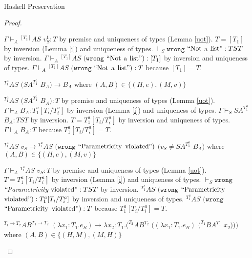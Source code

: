 \begin{theorem}{Haskell Preservation}
\begin{proof}
\begin{case}
$\Gamma\vdash_{A}{^{[T_{1}]}AS}$ $v_{S}^{1}:T$ by premise and uniqueness of types (Lemma \ref{uot}).  $T=[T_{1}]$ by inversion (Lemma \ref{i}) and uniqueness of types.  $\vdash_{S}\mathtt{wrong}$ $\mathrm{``Not}$ $\mathrm{a}$ $\mathrm{list"}:TST$ by inversion.  $\Gamma\vdash_{A}{^{[T_{1}]}A}S$ $(\mathtt{wrong}$ $\mathrm{``Not}$ $\mathrm{a}$ $\mathrm{list"}):[T_{1}]$ by inversion and uniqueness of types.  $\Gamma\vdash_{A}{^{[T_{1}]}A}S$ $(\mathtt{wrong}$ $\mathrm{``Not}$ $\mathrm{a}$ $\mathrm{list"}):T$ because $[T_{1}]=T$.
\end{case}


\begin{case}
$^{T_{1}^{a}}AS$ $(SA^{T_{1}^{a}}$ $B_{A})\rightarrow B_{A}$ where $(A,B)\in\lbrace(H,e),(M,v)\rbrace$

$^{T_{1}^{a}}AS$ $(SA^{T_{1}^{a}}$ $B_{A}):T$ by premise and uniqueness of types (Lemma \ref{uot}).  $\Gamma\vdash_{A}B_{A}:T_{1}^{a}[T_{i}/T_{i}^{a}]$ by inversion (Lemma \ref{i}) and uniqueness of types.  $\Gamma\vdash_{S}SA^{T_{1}^{a}}$ $B_{A}:TST$ by inversion.  $T=T_{1}^{a}[T_{i}/T_{i}^{a}]$ by inversion and uniqueness of types.  $\Gamma\vdash_{A}B_{A}:T$ because $T_{1}^{a}[T_{i}/T_{i}^{a}]=T$.
\end{case}


\begin{case}
$^{T_{1}^{a}}AS$ $v_{S}\rightarrow{^{T_{1}^{a}}A}S$ $(\mathtt{wrong}$ $\mathrm{``Parametricity}$ $\mathrm{violated"})$ $(v_{S}\neq SA^{T_{1}^{a}}$ $B_{A})$ where $(A,B)\in\lbrace(H,e),(M,v)\rbrace$

$\Gamma\vdash_{A}{^{T_{1}^{a}}A}S$ $v_{S}:T$ by premise and uniqueness of types (Lemma \ref{uot}).  $T=T_{1}^{a}[T_{i}/T_{i}^{a}]$ by inversion (Lemma \ref{i}) and uniqueness of types.  $\vdash_{S}\mathtt{wrong}$ \emph{``Parametricity} $\mathrm{violated"}:TST$ by inversion.  $^{T_{1}^{a}}AS$ $(\mathtt{wrong}$ $\mathrm{``Parametricity}$ $\mathrm{violated"}):T_{1}^{a}[T_{i}/T_{i}^{a}]$ by inversion and uniqueness of types.  $^{T_{1}^{a}}AS$ $(\mathtt{wrong}$ $\mathrm{``Parametricity}$ $\mathrm{violated"}):T$ because $T_{1}^{a}[T_{i}/T_{i}^{a}]=T$.
\end{case}


\begin{case}{\redruleh{\oshmfabsl}{\oshmfabsr}}

$^{T_{1}\rightarrow T_{2}}AB^{T_{1}\rightarrow T_{2}}$ $(\lambda x_{1}:T_{1}.e_{B})\rightarrow\lambda x_{2}:T_{1}.(^{T_{2}}AB^{T_{2}}$ $((\lambda x_{1}:T_{1}.e_{B})$ $(^{T_{1}}BA^{T_{1}}$ $x_{2})))$ where $(A,B)\in\lbrace(H,M),(M,H)\rbrace$


\end{case}
\end{proof}
\end{theorem}
